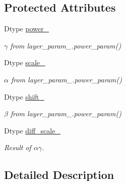 \subsection*{Protected Attributes}
\begin{DoxyCompactItemize}
\item 
\mbox{\label{classcaffe_1_1_power_layer_a882ce133988e4dd72a10d87fec4c04c3}} 
Dtype \mbox{\hyperlink{classcaffe_1_1_power_layer_a882ce133988e4dd72a10d87fec4c04c3}{power\+\_\+}}
\begin{DoxyCompactList}\small\item\em $ \gamma $ from layer\+\_\+param\+\_\+.\+power\+\_\+param() \end{DoxyCompactList}\item 
\mbox{\label{classcaffe_1_1_power_layer_a6684b2c6c2b2047d58c9d2809b86c39c}} 
Dtype \mbox{\hyperlink{classcaffe_1_1_power_layer_a6684b2c6c2b2047d58c9d2809b86c39c}{scale\+\_\+}}
\begin{DoxyCompactList}\small\item\em $ \alpha $ from layer\+\_\+param\+\_\+.\+power\+\_\+param() \end{DoxyCompactList}\item 
\mbox{\label{classcaffe_1_1_power_layer_a3a3143c4d6735d12cb5a41b1cb623bc9}} 
Dtype \mbox{\hyperlink{classcaffe_1_1_power_layer_a3a3143c4d6735d12cb5a41b1cb623bc9}{shift\+\_\+}}
\begin{DoxyCompactList}\small\item\em $ \beta $ from layer\+\_\+param\+\_\+.\+power\+\_\+param() \end{DoxyCompactList}\item 
\mbox{\label{classcaffe_1_1_power_layer_aa83169eaa1b573137aa6ed2b526879f0}} 
Dtype \mbox{\hyperlink{classcaffe_1_1_power_layer_aa83169eaa1b573137aa6ed2b526879f0}{diff\+\_\+scale\+\_\+}}
\begin{DoxyCompactList}\small\item\em Result of $ \alpha \gamma $. \end{DoxyCompactList}\end{DoxyCompactItemize}


\subsection{Detailed Description}
